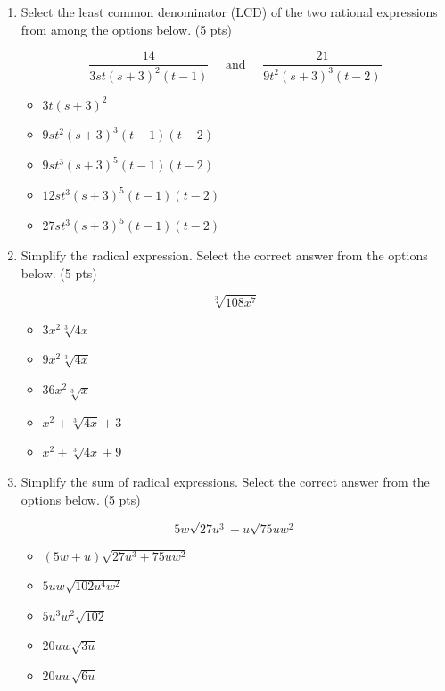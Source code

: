 \documentclass{ximera}
\begin{document}
\begin{enumerate}
$$\frac{3 x}{2 a} \cdot \frac{8 a^{3} x^{5}}{15 x}$$

\begin{itemize}
\item $\frac{45}{16 a^{4} x^{3}}$
\item $\frac{16 a^{4} x^{3}}{45}$
\item $\frac{24 a^{3}}{x^{6}}$
\item $\frac{12 a^{2} x^{5}}{15}$
\item $\frac{4 a^{2} x^{5}}{5}$
\end{itemize}

\item Select the least common denominator (LCD) of the two rational expressions from among the options below. (5 pts)

$$\frac{14}{3 s t(s+3)^{2}(t-1)} \quad \text { and } \quad \frac{21}{9 t^{2}(s+3)^{3}(t-2)}$$

\begin{itemize}
\item $3 t(s+3)^{2}$
\item $9 s t^{2}(s+3)^{3}(t-1)(t-2)$
\item $9 s t^{3}(s+3)^{5}(t-1)(t-2)$
\item $12 s t^{3}(s+3)^{5}(t-1)(t-2)$
\item $27 s t^{3}(s+3)^{5}(t-1)(t-2)$
\end{itemize}

\item Simplify the radical expression. Select the correct answer from the options below. (5 pts)

$$\sqrt[3]{108 x^{7}}$$

\begin{itemize}
\item $3 x^{2} \sqrt[3]{4 x}$
\item $9 x^{2} \sqrt[3]{4 x}$
\item $36 x^{2} \sqrt[3]{x}$
\item $x^{2}+\sqrt[3]{4 x}+3$
\item $x^{2}+\sqrt[3]{4 x}+9$
\end{itemize}

\item Simplify the sum of radical expressions. Select the correct answer from the options below. (5 pts)

$$5 w \sqrt{27 u^{3}}+u \sqrt{75 u w^{2}}$$

\begin{itemize}
\item $(5 w+u) \sqrt{27 u^{3}+75 u w^{2}}$
\item $5 u w \sqrt{102 u^{4} w^{2}}$
\item $5 u^{3} w^{2} \sqrt{102}$
\item $20 u w \sqrt{3 u}$
\item $20 u w \sqrt{6 u}$
\end{itemize}


\end{enumerate}
\end{document}
